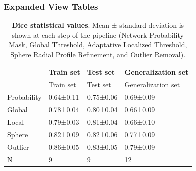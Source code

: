 \hypertarget{expanded-view-tables}{%
\subsubsection{Expanded View Tables}\label{expanded-view-tables}}

\begin{tablenos:tagged-table}[EV1]

\begin{longtable}[]{@{}llll@{}}
\caption{\textbf{Dice statistical values}. Mean ± standard deviation is shown at each step of the pipeline (Network Probability Mask, Global Threshold, Adaptative Localized Threshold, Sphere Radial Profile Refinement, and Outlier Removal). \label{tbl:dice-statistics}}\label{tbl:dice-statistics}\tabularnewline
\toprule()
& Train set & Test set & Generalization set \\
\midrule()
\endfirsthead
\toprule()
& Train set & Test set & Generalization set \\
\midrule()
\endhead
Probability & 0.64±0.11 & 0.75±0.06 & 0.69±0.09 \\
Global & 0.78±0.04 & 0.80±0.04 & 0.66±0.09 \\
Local & 0.79±0.03 & 0.81±0.04 & 0.66±0.10 \\
Sphere & 0.82±0.09 & 0.82±0.06 & 0.77±0.09 \\
Outlier & 0.86±0.05 & 0.83±0.05 & 0.79±0.09 \\
N & 9 & 9 & 12 \\
\bottomrule()
\end{longtable}

\end{tablenos:tagged-table}

